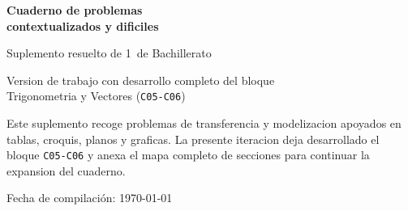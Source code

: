 \begin{titlepage}
\thispagestyle{fancy}
\centering
\vspace*{2.6cm}

{\Huge\bfseries Cuaderno de problemas\\[0.35em] contextualizados y dificiles\par}
\vspace{1.1cm}

{\Large Suplemento resuelto de 1\textordmasculine\ de Bachillerato\par}
\vspace{1.3cm}

{\large Version de trabajo con desarrollo completo del bloque\\[0.25em]
Trigonometria y Vectores (\texttt{C05-C06})\par}
\vspace{1.3cm}

\begin{tcolorbox}[basebox,width=0.86\textwidth]
Este suplemento recoge problemas de transferencia y modelizacion apoyados en tablas, croquis,
planos y graficas. La presente iteracion deja desarrollado el bloque \texttt{C05-C06} y
anexa el mapa completo de secciones para continuar la expansion del cuaderno.
\end{tcolorbox}

\vfill
{\large Fecha de compilaci\'on: \today\par}
\end{titlepage}
